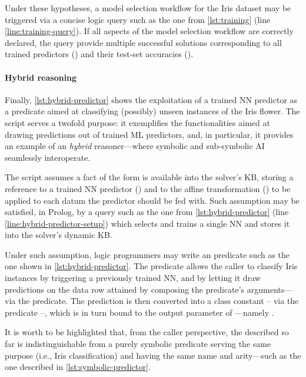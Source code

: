 \documentclass[runningheads]{llncs}
\begin{document}
Under these hypotheses, a model selection workflow for the Iris dataset may be triggered via a concise logic query such as the one from \cref{lst:training} (line \ref{line:training-query}).
%
If all aspects of the model selection workflow are correctly declared, the query provide multiple successful solutions corresponding to all trained predictors () and their test-set accuracies ().

\paragraph{Hybrid reasoning}

\prologimport[
    float,
    label={lst:hybrid-predictor},
    caption={Exploitation of the NN classifier trained in \cref{lst:training} to create an hybrid predicate} %
]{listings/hybrid-predictor.pl}

Finally, \cref{lst:hybrid-predictor} shows the exploitation of a trained NN predictor as a predicate aimed at classifying (possibly) unseen instances of the Iris flower.
%
The script serves a twofold purpose: it exemplifies the \mllib{} functionalities aimed at drawing predictions out of trained ML predictors, and, in particular, it provides an example of an \emph{hybrid} reasoner---where symbolic and sub-symbolic AI seamlessly interoperate.

The script assumes a fact of the form  is available into the solver's KB, storing a reference to a trained NN predictor () and to the affine transformation () to be applied to each datum the predictor should be fed with.
%
Such assumption may be satisfied, in Prolog, by a query such as the one from \cref{lst:hybrid-predictor} (line \ref{line:hybrid-predictor-setup}) which selects and trains a single NN and stores it into the solver's dynamic KB.

Under such assumption, logic programmers may write an  predicate such as the one shown in \cref{lst:hybrid-predictor}.
%
The predicate allows the caller to classify Iris instances by triggering a previously trained NN, and by letting it draw predictions on the data row attained by composing the predicate's arguments---via the  predicate.
%
The prediction is then converted into a class constant -- via the  predicate --, which is in turn bound to the output parameter of ---namely .

It is worth to be highlighted that, from the caller perspective, the  described so far is indistinguishable from a purely symbolic predicate serving the same purpose (i.e., Iris classification) and having the same name and arity---such as the one described in \cref{lst:symbolic-predictor}.
\end{document}
